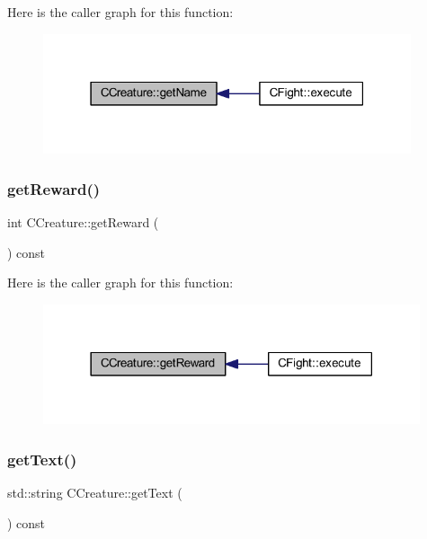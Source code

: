 Here is the caller graph for this function\+:\nopagebreak
\begin{figure}[H]
\begin{center}
\leavevmode
\includegraphics[width=307pt]{class_c_creature_add6ec843df265dc929acc0c3ef7ba8d0_icgraph}
\end{center}
\end{figure}
\mbox{\label{class_c_creature_a96cdca38cdd52403c6a6dab222a58f38}} 
\subsubsection{\texorpdfstring{get\+Reward()}{getReward()}}
{\footnotesize\ttfamily int C\+Creature\+::get\+Reward (\begin{DoxyParamCaption}{ }\end{DoxyParamCaption}) const\hspace{0.3cm}{\ttfamily [inline]}}

Here is the caller graph for this function\+:\nopagebreak
\begin{figure}[H]
\begin{center}
\leavevmode
\includegraphics[width=314pt]{class_c_creature_a96cdca38cdd52403c6a6dab222a58f38_icgraph}
\end{center}
\end{figure}
\mbox{\label{class_c_creature_a876396dce2bd6e42c09bb9edc72ed0ba}} 
\subsubsection{\texorpdfstring{get\+Text()}{getText()}}
{\footnotesize\ttfamily std\+::string C\+Creature\+::get\+Text (\begin{DoxyParamCaption}{ }\end{DoxyParamCaption}) const\hspace{0.3cm}{\ttfamily [inline]}}

